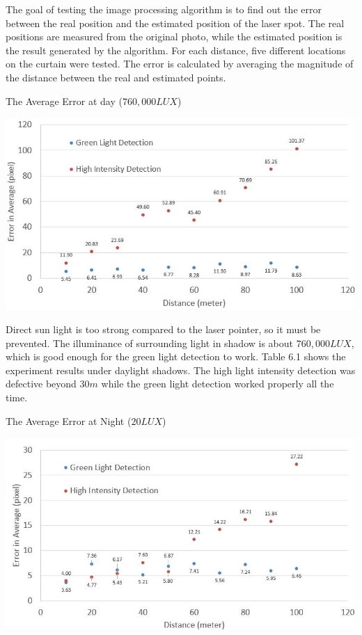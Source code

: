 \documentclass[letterpaper,12pt,oneside]{book}
\begin{document}
		The goal of testing the image processing algorithm is to find out the error between the real position and the estimated position of the laser spot. The real positions are measured from the original photo, while the estimated position is the result generated by the algorithm. For each distance, five different locations on the curtain were tested. The error is calculated by averaging the magnitude of the distance between the real and estimated points. 
		
		\begin{table}[ht!]
			\begin{center}
				\caption{The Average Error at day ($760,000LUX$)}
				\includegraphics[scale = 0.6]{dataday.jpg}
			\end{center}
		\end{table}
		
		 Direct sun light is too strong compared to the laser pointer, so it must be prevented. The illuminance of surrounding light in shadow is about $760,000LUX$, which is good enough for the green light detection to work. Table 6.1 shows the experiment results under daylight shadows. The high light intensity detection was defective beyond $30m$ while the green light detection worked properly all the time.  
		 
		
		\begin{table}[ht!]
			\begin{center}
				\caption{The Average Error at Night ($20LUX$)}
				\includegraphics[scale = 0.6]{datanight.jpg}
			\end{center}
		\end{table}
		
\end{document}
